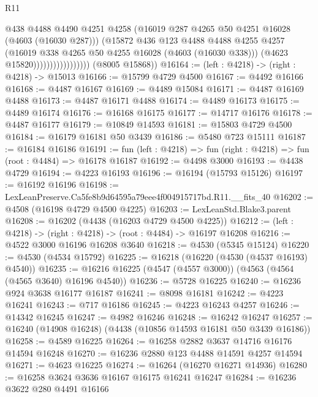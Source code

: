 \begin{lexlean}{R11}
\begin{coremodule}
                                    @438
                                    @4488
                                    @4490
                                    @4251
                                    @4258
                                    (@16019 @287 @4265 @50 @4251 @16028 (@4603 (@16030 @287)))
                                    (@15872
                                      @436
                                      @123
                                      @4488
                                      @4488
                                      @4255
                                      @4257
                                      (@16019 @338 @4265 @50 @4255 @16028 (@4603 (@16030 @338)))
                                      (@4623 @15820)))))))))))))))))
      (@8005 @15868))
@16164 := (left : @4218) -> (right : @4218) -> @15013
@16166 := @15799 @4729 @4500
@16167 := @4492 @16166
@16168 := @4487 @16167
@16169 := @4489 @15084
@16171 := @4487 @16169 @4488
@16173 := @4487 @16171 @4488
@16174 := @4489 @16173
@16175 := @4489 @16174
@16176 := @16168 @16175
@16177 := @14717 @16176
@16178 := @4487 @16177
@16179 := @10849 @14593
@16181 := @15803 @4729 @4500
@16184 := @16179 @16181 @50 @3439
@16186 := @5480 @723 @15111
@16187 := @16184 @16186
@16191 := fun (left : @4218) => fun (right : @4218) => fun (root : @4484) => @16178 @16187
@16192 := @4498 @3000
@16193 := @4438 @4729
@16194 := @4223 @16193
@16196 := @16194 (@15793 @15126)
@16197 := @16192 @16196
@16198 := LexLeanPreserve.Ca5fe8b9d64595a79eee4f004915717bd.R11.__fits_40
@16202 := @4508 (@16198 @4729 @4500 @4225)
@16203 := LexLeanStd.Blake3.parent
@16208 := @16202 (@4438 (@16203 @4729 @4500 @4225))
@16212 := (left : @4218) -> (right : @4218) -> (root : @4484) -> @16197 @16208
@16216 := @4522 @3000 @16196 @16208 @3640
@16218 := @4530 (@5345 @15124)
@16220 := @4530 (@4534 @15792)
@16225 := @16218 (@16220 (@4530 (@4537 @16193) @4540))
@16235 := @16216 @16225 (@4547 (@4557 @3000)) (@4563 (@4564 (@4565 @3640) @16196 @4540))
@16236 := @5728 @16225
@16240 := @16236 @924 @3638 @16177 @16187
@16241 := @8098 @16181
@16242 := @4223 @16241
@16243 := @717 @16186
@16245 := @4223 @16243 @4257
@16246 := @14342 @16245
@16247 := @4982 @16246
@16248 := @16242 @16247
@16257 := @16240 (@14908 @16248) (@4438 (@10856 @14593 @16181 @50 @3439 @16186))
@16258 := @4589 @16225
@16264 := @16258 @2882 @3637 @14716 @16176 @14594 @16248
@16270 := @16236 @2880 @123 @4488 @14591 @4257 @14594
@16271 := @4623 @16225
@16274 := @16264 (@16270 @16271 @14936)
@16280 := @16258 @3624 @3636 @16167 @16175 @16241 @16247
@16284 := @16236 @3622 @280 @4491 @16166

\end{coremodule}
\end{lexlean}
